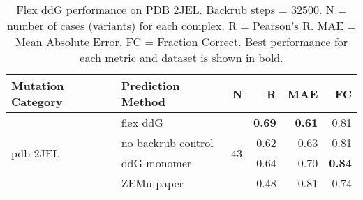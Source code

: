 \begin{table}
  \begin{tabular}{llrrrr}
\toprule
Mutation Category &   Prediction Method &   N &    R &  MAE &   FC \\
\midrule
 \multirow{ 4}{*}{pdb-2JEL} & flex ddG & \multirow{ 4}{*}{43} & \textbf{0.69} & \textbf{0.61} & 0.81  \\
 & no backrub control & & 0.62 & 0.63 & 0.81  \\
 & ddG monomer & & 0.64 & 0.70 & \textbf{0.84}  \\
 & ZEMu paper & & 0.48 & 0.81 & 0.74  \\
\bottomrule
\end{tabular}
  \caption[Flex ddG performance on PDB 2JEL]{
    Flex ddG performance on PDB 2JEL. Backrub steps = 32500. N = number of cases (variants) for each complex. R = Pearson's R. MAE = Mean Absolute Error. FC = Fraction Correct. Best performance for each metric and dataset is shown in bold.
  } \label{tab:table-pdb-2JEL}
\end{table}
